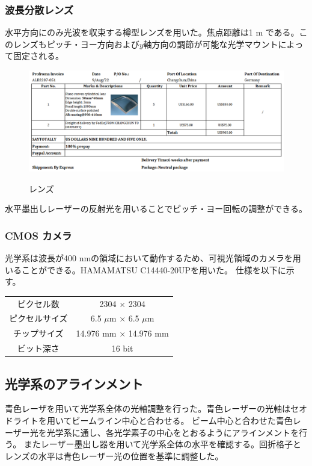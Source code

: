 \documentclass[a4paper,11pt,uplatex]{jsbook}
\begin{document}
\subsubsection{波長分散レンズ}
水平方向にのみ光波を収束する樽型レンズを用いた。焦点距離は1 m である。このレンズもピッチ・ヨー方向および$y$軸方向の調節が可能な光学マウントによって固定される。
\begin{figure}[tb]
  \centering
  \includegraphics[width=0.8\linewidth]{image/3-lens.png}\\
  \caption{レンズ}
  \label{lens}
\end{figure}
水平墨出しレーザーの反射光を用いることでピッチ・ヨー回転の調整ができる。

\subsubsection{CMOS カメラ}
光学系は波長が400 nmの領域において動作するため、可視光領域のカメラを用いることができる。HAMAMATSU C14440-20UPを用いた。
仕様を以下に示す。
\begin{table}[h]
\centering
\begin{tabular}{c|c}
  ピクセル数 & 2304 $\times$ 2304\\
  ピクセルサイズ & 6.5 $\mu$m $\times$ 6.5 $\mu$m\\
  チップサイズ & 14.976 mm $\times$ 14.976 mm\\
  ビット深さ & 16 bit\\ 
\end{tabular}
\end{table}

\subsection{光学系のアラインメント}
青色レーザを用いて光学系全体の光軸調整を行った。青色レーザーの光軸はセオドライトを用いてビームライン中心と合わせる。
ビーム中心と合わせた青色レーザー光を光学系に通し、各光学素子の中心をとおるようにアラインメントを行う。
またレーザー墨出し器を用いて光学系全体の水平を確認する。回折格子とレンズの水平は青色レーザー光の位置を基準に調整した。
\end{document}
